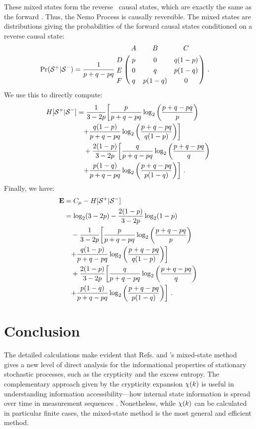 \documentclass[prl,twocolumn,showpacs,superscriptaddress,preprintnumbers,floatfix]{revtex4}
\theoremstyle{plain}   \newtheorem{Lem}{Lemma}
\theoremstyle{plain} 	\newtheorem{Cor}{Corollary}
\theoremstyle{plain} 	\newtheorem{The}{Theorem}
\theoremstyle{plain} 	\newtheorem{Prop}{Proposition}
\theoremstyle{plain} 	\newtheorem*{Conj}{Conjecture}
\theoremstyle{plain}	\newtheorem*{Rem}{Remark}
\theoremstyle{plain}	\newtheorem*{Def}{Definition}
\theoremstyle{plain}	\newtheorem*{Not}{Notation}
\begin{document}
These mixed states form the reverse \eM\ causal states, which are exactly the
same as the forward \eM. Thus, the Nemo Process is causally reversible. The
mixed states are distributions giving the probabilities of the forward causal
states conditioned on a reverse causal state:
\begin{align*}
\Pr(\FutureCausalState|\PastCausalState) &= \frac{1}{p + q - pq}
\bordermatrix{
  & A & B & C \cr
D & p & 0 & q(1-p) \cr
E & 0 & q & p(1-q) \cr
F & q & p(1-q) & 0 \cr
} ~.
\end{align*}
We use this to directly compute:
\begin{align*}
H[{\mathcal{S}}^{+}|{\mathcal{S}}^{-}] 
    &= \frac{1}{3-2p} \biggl[ \frac{p}{p+q-pq} \log_2 \left(\frac{p+q-pq}{p}\right) \biggl.\\
    &\quad \biggl. + \frac{q(1-p)}{p + q - pq} \log_2 \left(\frac{p+q-pq}{q(1-p)}\right) \biggr]\\
    &\quad +\frac{2(1-p)}{3-2p} \biggl[ \frac{q}{p+q-pq} \log_2 \left(\frac{p+q-pq}{q}\right) \biggr.\\
    &\quad \biggl. + \frac{p(1-q)}{p+q-pq} \log_2
	\left(\frac{p+q-pq}{p(1-q)}\right) \biggr] ~.
\end{align*}
Finally, we have:
\begin{align*}
{\bf E} &= C_\mu - H[{\mathcal{S}}^{+}|{\mathcal{S}}^{-}]\\
    &= \log_2(3-2p) - \frac{2(1-p)}{3-2p} \log_2 (1-p) \\
    &\quad - \frac{1}{3-2p} \biggl[ \frac{p}{p+q-pq} \log_2 \left(\frac{p+q-pq}{p}\right) \biggl.\\
    &\quad \biggl. + \frac{q(1-p)}{p + q - pq} \log_2 \left(\frac{p+q-pq}{q(1-p)}\right) \biggr]\\
    &\quad +\frac{2(1-p)}{3-2p} \biggl[ \frac{q}{p+q-pq} \log_2 \left(\frac{p+q-pq}{q}\right) \biggr.\\
    &\quad \biggl. + \frac{p(1-q)}{p+q-pq} \log_2
	\left(\frac{p+q-pq}{p(1-q)}\right) \biggr] ~.
\end{align*}

\section{Conclusion}

The detailed calculations make evident that Refs. \cite{Crut08a} and
\cite{Crut08b}'s mixed-state method gives a new level of direct analysis for
the informational properties of stationary stochastic processes, such as the
crypticity and the excess entropy. The complementary approach given by the
crypticity expansion $\chi(k)$ is useful in understanding information
accessibility---how internal state information is spread over time in
measurement sequences \cite{Maho09a}. Nonetheless, while $\chi(k)$ can be
calculated in particular finite cases, the mixed-state method is the most
general and efficient method.


\end{document}
